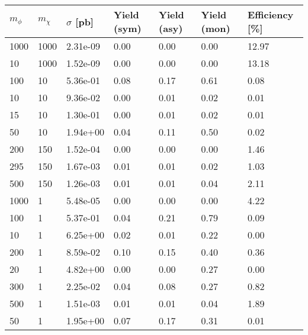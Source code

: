 \begin{table}
\small
\centering
\begin{tabular}{lllllll}
\label{summaryTableAN_DMbbP_xs10_2p1fb_exp}
\hline
$m_\phi$ & $m_\chi$ & $\sigma$ [pb] & Yield (sym) & Yield (asy) & Yield (mon) & Efficiency [\%] \\ \hline
1000      &   1000      &   2.31e-09  &   0.00      &   0.00      &   0.00      &   12.97     \\ 
10        &   1000      &   1.52e-09  &   0.00      &   0.00      &   0.00      &   13.18     \\ 
100       &   10        &   5.36e-01  &   0.08      &   0.17      &   0.61      &   0.08      \\ 
10        &   10        &   9.36e-02  &   0.00      &   0.01      &   0.02      &   0.01      \\ 
15        &   10        &   1.30e-01  &   0.00      &   0.01      &   0.02      &   0.01      \\ 
50        &   10        &   1.94e+00  &   0.04      &   0.11      &   0.50      &   0.02      \\ 
200       &   150       &   1.52e-04  &   0.00      &   0.00      &   0.00      &   1.46      \\ 
295       &   150       &   1.67e-03  &   0.01      &   0.01      &   0.02      &   1.03      \\ 
500       &   150       &   1.26e-03  &   0.01      &   0.01      &   0.04      &   2.11      \\ 
1000      &   1         &   5.48e-05  &   0.00      &   0.00      &   0.00      &   4.22      \\ 
100       &   1         &   5.37e-01  &   0.04      &   0.21      &   0.79      &   0.09      \\ 
10        &   1         &   6.25e+00  &   0.02      &   0.01      &   0.22      &   0.00      \\ 
200       &   1         &   8.59e-02  &   0.10      &   0.15      &   0.40      &   0.36      \\ 
20        &   1         &   4.82e+00  &   0.00      &   0.00      &   0.27      &   0.00      \\ 
300       &   1         &   2.25e-02  &   0.04      &   0.08      &   0.27      &   0.82      \\ 
500       &   1         &   1.51e-03  &   0.01      &   0.01      &   0.04      &   1.89      \\ 
50        &   1         &   1.95e+00  &   0.07      &   0.17      &   0.31      &   0.01      \\ 

\end{tabular}
\end{table}
